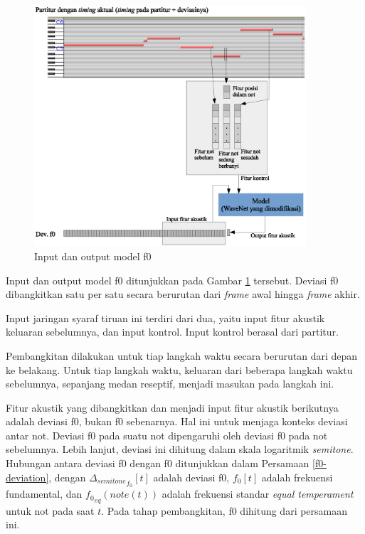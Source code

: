 \begin{figure}[htbp]
    \centering
    \includegraphics[width=0.9\textwidth]{resources/f0-model-in-out.eps}
    \caption{Input dan output model f0}\label{fig-f0-model-in-out}
\end{figure}

Input dan output model f0 ditunjukkan pada Gambar \ref{fig-f0-model-in-out} tersebut. Deviasi f0 dibangkitkan satu per satu secara berurutan dari \textit{frame} awal hingga \textit{frame} akhir.

Input jaringan syaraf tiruan ini terdiri dari dua, yaitu input fitur akustik keluaran sebelumnya, dan input kontrol. Input kontrol berasal dari partitur.

Pembangkitan dilakukan untuk tiap langkah waktu secara berurutan dari depan ke belakang. Untuk tiap langkah waktu, keluaran dari beberapa langkah waktu sebelumnya, sepanjang medan reseptif, menjadi masukan pada langkah ini.

Fitur akustik yang dibangkitkan dan menjadi input fitur akustik berikutnya adalah deviasi f0, bukan f0 sebenarnya. Hal ini untuk menjaga konteks deviasi antar not. Deviasi f0 pada suatu not dipengaruhi oleh deviasi f0 pada not sebelumnya. Lebih lanjut, deviasi ini dihitung dalam skala logaritmik \textit{semitone}. Hubungan antara deviasi f0 dengan f0 ditunjukkan dalam Persamaan \ref{f0-deviation}, dengan ${\Delta_{semitone}}_{f_0}[t]$ adalah deviasi f0, $f_0[t]$ adalah frekuensi fundamental, dan ${f_0}_{eq}(note(t))$ adalah frekuensi standar \textit{equal temperament} untuk not pada saat $t$. Pada tahap pembangkitan, f0 dihitung dari persamaan ini.

